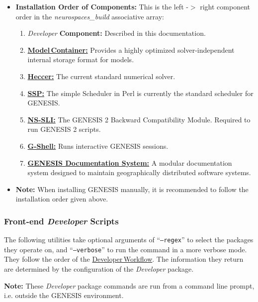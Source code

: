 \documentclass[12pt]{article}
\begin{document}
\begin{itemize}
   \item {\bf Installation Order of Components:} This is the left -$>$ right component order in the {\it neurospaces\_build} associative array:
   \begin{enumerate}
      \item {\it Developer} {\bf Component:} Described in this documentation.
      \item \href{../model-container/model-container.tex}{\bf Model\,Container:} Provides a highly optimized solver-independent internal storage format for models.
      \item \href{../heccer/heccer.tex}{\bf Heccer:} The current standard numerical solver.
      \item \href{../ssp/ssp.tex}{\bf SSP:} The simple Scheduler in Perl is currently the standard scheduler for GENESIS.
      \item \href{../nnsli/nssli.tex}{\bf NS-SLI:} The GENESIS 2 Backward Compatibility Module. Required to run GENESIS 2 scripts.
      \item \href{../gshell/gshel.tex}{\bf G-Shell:} Runs interactive GENESIS sessions.
      \item \href{../documentation-overview/documentation-overview.tex}{\bf GENESIS Documentation System:} A modular documentation system designed to maintain geographically distributed software systems.
   \end{enumerate}
   \item {\bf Note:} When installing GENESIS manually, it is recommended to follow the installation order given above. 
\end{itemize}


\subsubsection*{Front-end {\it Developer} Scripts}

The following utilities take optional arguments of ``{\tt --regex}'' to select the packages they operate on, and ``{\tt --verbose}'' to run the command in a more verbose mode. They follow the order of the \href{../workflow-developer/workflow-developer.tex}{Developer\,Workflow}. The information they return are determined by the configuration of the {\it Developer} package.

{\bf Note:} These {\it Developer} package commands are run from a command line prompt, i.e. outside the GENESIS environment.
\end{document}
